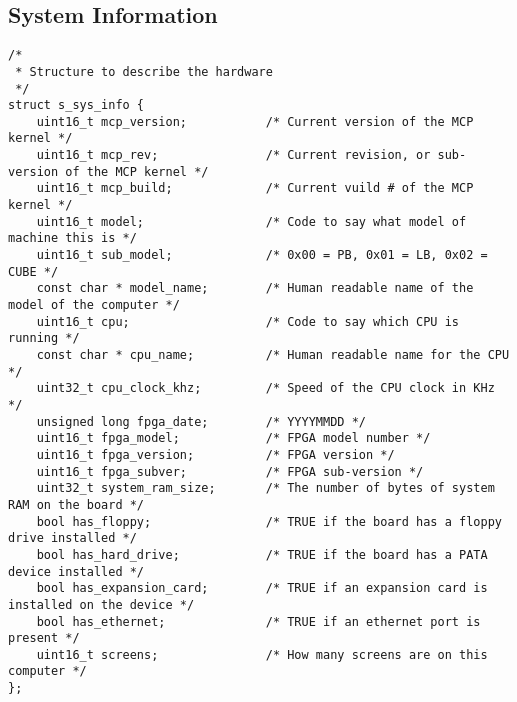 \subsection*{System Information}
\begin{lstlisting}
/*
 * Structure to describe the hardware
 */
struct s_sys_info {
    uint16_t mcp_version;     		/* Current version of the MCP kernel */
    uint16_t mcp_rev;         		/* Current revision, or sub-version of the MCP kernel */
    uint16_t mcp_build;       		/* Current vuild # of the MCP kernel */
    uint16_t model;           		/* Code to say what model of machine this is */
    uint16_t sub_model;         	/* 0x00 = PB, 0x01 = LB, 0x02 = CUBE */
    const char * model_name;        /* Human readable name of the model of the computer */
    uint16_t cpu;             		/* Code to say which CPU is running */
    const char * cpu_name;          /* Human readable name for the CPU */
    uint32_t cpu_clock_khz;     	/* Speed of the CPU clock in KHz */
    unsigned long fpga_date;        /* YYYYMMDD */    
    uint16_t fpga_model;       		/* FPGA model number */
    uint16_t fpga_version;    		/* FPGA version */
    uint16_t fpga_subver;     		/* FPGA sub-version */
    uint32_t system_ram_size;		/* The number of bytes of system RAM on the board */
    bool has_floppy;                /* TRUE if the board has a floppy drive installed */
    bool has_hard_drive;            /* TRUE if the board has a PATA device installed */
    bool has_expansion_card;        /* TRUE if an expansion card is installed on the device */
    bool has_ethernet;              /* TRUE if an ethernet port is present */
    uint16_t screens;         		/* How many screens are on this computer */
};
\end{lstlisting}

